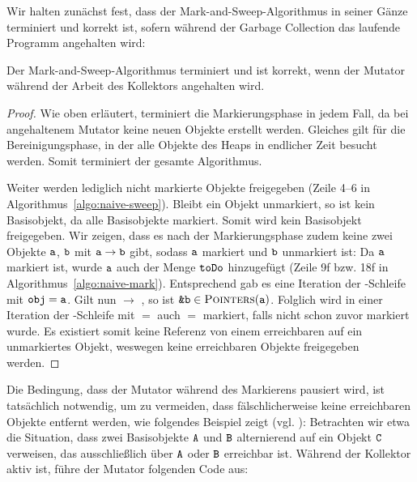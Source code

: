 Wir halten zunächst fest, dass der Mark-and-Sweep-Algorithmus in seiner Gänze terminiert und korrekt ist, sofern während der Garbage Collection das laufende Programm angehalten wird:

\begin{mybox}
\begin{satz}
	\label{satz:mark-sweep-correctness}
	Der Mark-and-Sweep-Algorithmus terminiert und ist korrekt, wenn der Mutator während der Arbeit des Kollektors angehalten wird.
\end{satz}
\end{mybox}

\begin{proof}
	Wie oben erläutert, terminiert die Markierungsphase in jedem Fall, da bei angehaltenem Mutator keine neuen Objekte erstellt werden.
	Gleiches gilt für die Bereinigungsphase, in der alle Objekte des Heaps in endlicher Zeit besucht werden.
	Somit terminiert der gesamte Algorithmus.
	
	Weiter werden lediglich nicht markierte Objekte freigegeben (Zeile 4--6 in Algorithmus~\ref{algo:naive-sweep}).
	Bleibt ein Objekt  unmarkiert, so ist  kein Basisobjekt, da  alle Basisobjekte markiert.
	Somit wird kein Basisobjekt freigegeben.
	Wir zeigen, dass es nach der Markierungsphase zudem keine zwei Objekte $\texttt{a}$, $\texttt{b}$ mit $\texttt{a} \rightarrow \texttt{b}$ gibt, sodass $\texttt{a}$ markiert und $\texttt{b}$ unmarkiert ist:
	Da $\texttt{a}$ markiert ist, wurde $\texttt{a}$ auch der Menge $\texttt{toDo}$ hinzugefügt (Zeile 9f bzw. 18f in Algorithmus~\ref{algo:naive-mark}).
	Entsprechend gab es eine Iteration der \WHILE-Schleife mit $\texttt{obj} = \texttt{a}$.
	Gilt nun  $\rightarrow$ , so ist $\texttt{\&b} \in \textsc{Pointers}(\texttt{a})$.
	Folglich wird in einer Iteration der \FOREACH-Schleife mit  $=$  auch  $=$  markiert, falls  nicht schon zuvor markiert wurde.
	Es existiert somit keine Referenz von einem erreichbaren auf ein unmarkiertes Objekt, weswegen keine erreichbaren Objekte freigegeben werden.
\end{proof}

Die Bedingung, dass der Mutator während des Markierens pausiert wird, ist tatsächlich notwendig, um zu vermeiden, dass fälschlicherweise keine erreichbaren Objekte entfernt werden, wie folgendes Beispiel zeigt (vgl. \cite[969]{dijkstra1978}):
Betrachten wir etwa die Situation, dass zwei Basisobjekte $\texttt{A}$ und $\texttt{B}$ alternierend auf ein Objekt $\texttt{C}$ verweisen, das ausschließlich über $\texttt{A}$ oder $\texttt{B}$ erreichbar ist.
Während der Kollektor aktiv ist, führe der Mutator folgenden Code aus:

